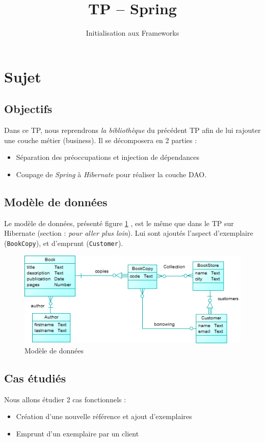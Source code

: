 \documentclass[small,algo]{dushClass}
\title{TP -- Spring}
\subtitle{Initialisation aux Frameworks}
\begin{document}
\section{Sujet}\label{spec-sec}

\subsection{Objectifs}

Dans ce TP, nous reprendrons \emph{la bibliothèque} du précédent TP afin de lui rajouter une couche métier (business). Il se décomposera en 2 parties : 
\begin{itemize}
\item Séparation des préoccupations et injection de dépendances
\item Coupage de \emph{Spring} à \emph{Hibernate} pour réaliser la couche DAO.
\end{itemize}

\subsection{Modèle de données}

Le modèle de données, présenté figure \ref{model} , est le même que dans le TP sur Hibernate (section : \emph{pour aller plus loin}). Lui sont ajoutés l'aspect d'exemplaire (\texttt{BookCopy}), et d'emprunt (\texttt{Customer}).

\begin{figure}[ht]\label{model}
	\center
	\includegraphics{images/model_real.png}
	\caption{Modèle de données}
\end{figure}

\subsection{Cas étudiés}\label{spec-ssec}

Nous allons étudier 2 cas fonctionnels :
\begin{itemize}
\item Création d'une nouvelle référence et ajout d'exemplaires
\item Emprunt d'un exemplaire par un client%
\end{itemize}
\end{document}
